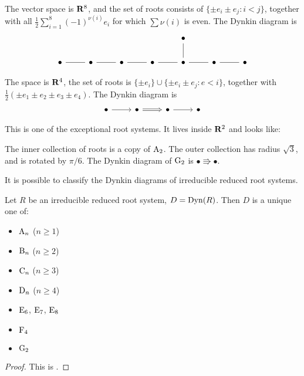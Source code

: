 \begin{example}
The vector space is $\mathbf{R}^8$, and the set of roots consists of 
$\{\pm e_i\pm e_j:i<j\}$, together with all 
$\frac 1 2 \sum_{i=1}^8 (-1)^{\nu(i)} e_i$ for which $\sum \nu(i)$ is even. The 
Dynkin diagram is 
\[\begin{tikzcd}
  & & & & \bullet \\
  \bullet \ar[r, dash] 
    & \bullet \ar[r, dash]
    & \bullet \ar[r, dash]
    & \bullet \ar[r, dash]
    & \bullet \ar[r, dash] \ar[u, dash]
    & \bullet \ar[r, dash] 
    & \bullet 
\end{tikzcd}\]
\end{example}

\begin{example}
The space is $\mathbf{R}^4$, the set of roots is 
$\{\pm e_i\}\cup \{\pm e_i\pm e_j:e<i\}$, together with 
$\frac 1 2(\pm e_1\pm e_2\pm e_3\pm e_4)$. The Dynkin diagram is 
\[\begin{tikzcd}
  \bullet \ar[r] 
    & \bullet \ar[r, Rightarrow] 
    & \bullet \ar[r] 
    & \bullet
\end{tikzcd}\]
\end{example}

\begin{example}
This is one of the exceptional root systems. It lives inside $\mathbf{R}^2$ and looks 
like:
\begin{center}
\end{center}
The inner collection of roots is a copy of $\mathrm{A}_2$. The outer collection 
has radius $\sqrt 3$, and is rotated by $\pi/6$. The Dynkin diagram of 
$\mathrm{G}_2$ is $\bullet \Rrightarrow \bullet$. 
\end{example}

It is possible to classify the Dynkin diagrams of irreducible reduced root 
systems. 

\begin{theorem}
Let $R$ be an irreducible reduced root system, $D=\operatorname{Dyn}(R)$. Then $D$ is a 
unique one of: 
\begin{itemize}
  \item $\mathrm{A}_n$ ($n\geqslant 1$)
  \item $\mathrm{B}_n$ ($n\geqslant 2$)
  \item $\mathrm{C}_n$ ($n\geqslant 3$)
  \item $\mathrm{D}_n$ ($n\geqslant 4$)
  \item $\mathrm{E}_6$, $\mathrm{E}_7$, $\mathrm{E}_8$
  \item $\mathrm{F}_4$
  \item $\mathrm{G}_2$
\end{itemize}
\end{theorem}
\begin{proof}
This is \cite[VI \S 4.2 th.3]{bourbaki-lie-alg-4-6}. 
\end{proof}

